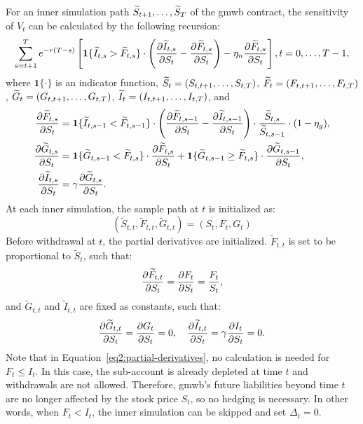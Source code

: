 For an inner simulation path $\widetilde{S}_{t+1},\ldots,\widetilde{S}_{T}$ of the \gls{gmwb} contract, the sensitivity of $V_t$ can be calculated by the following recursion:
\begin{equation}
    \sum_{s=t+1}^{T} e^{-r(T-s)} \left[\bm{1}\{\widetilde{I}_{t,s} > \widetilde{F}_{t,s}\} \cdot \left( \frac{\partial \widetilde{I}_{t,s}}{ \partial S_t} - \frac{\partial \widetilde{F}_{t,s}}{ \partial S_t}\right)- \eta_n \frac{\partial \widetilde{F}_{t,s}}{ \partial S_t}\right], \nonumber \\
    t=0,\ldots,T-1, 
\end{equation}
where $\bm{1}\{\cdot\}$ is an indicator function, $\widetilde{S}_t = (S_{t, t+1},\ldots,S_{t, T})$, $\widetilde{F}_t = (F_{t, t+1},\ldots,F_{t, T})$, $\widetilde{G}_t = (G_{t, t+1},\ldots,G_{t, T})$, $\widetilde{I}_t = (I_{t, t+1},\ldots,I_{t, T})$, and
\begin{align} \label{eq2:partial-derivatives}
    \frac{\partial \widetilde{F}_{t, s}}{ \partial S_t} &= \bm{1}\{\widetilde{I}_{t, s-1} < \widetilde{F}_{t, s-1}\}\cdot\left( \frac{\partial \widetilde{F}_{t, s-1}}{ \partial S_t} - \frac{\partial \widetilde{I}_{t, s-1}}{ \partial S_t}\right) \cdot \frac{\widetilde{S}_{t, s}}{\widetilde{S}_{t, s-1}}\cdot (1-\eta_g),\nonumber \\
    \frac{\partial \widetilde{G}_{t, s}}{ \partial S_t} &= \bm{1}\{\widetilde{G}_{t, s-1} < \widetilde{F}_{t, s}\}\cdot\frac{\partial \widetilde{F}_{t, s}}{ \partial S_t} + \bm{1}\{\widetilde{G}_{t, s-1} \geq \widetilde{F}_{t, s}\}\cdot\frac{\partial \widetilde{G}_{t, s-1}}{ \partial S_t},\nonumber \\
    \frac{\partial \widetilde{I}_{t, s}}{ \partial S_t} &= \gamma \frac{\partial \widetilde{G}_{t, s}}{ \partial S_t}.
\end{align}
At each inner simulation, the sample path at $t$ is initialized as:
\begin{equation}
    (\tilde{S}_{t, t}, \tilde{F}_{t, t}, \tilde{G}_{t, t}) = (S_t, F_t, G_t) 
\end{equation}
Before withdrawal at $t$, the partial derivatives are initialized. $\tilde{F}_{t, t}$ is set to be proportional to $\tilde{S}_{t}$, such that:
\begin{equation}
    \frac{\partial \widetilde{F}_{t, t}}{ \partial S_t} = \frac{\partial F_t}{ \partial S_t} = \frac{F_t}{S_t},
\end{equation}
and $\tilde{G}_{t, t}$ and $\tilde{I}_{t, t}$ are fixed as constants, such that:
\begin{equation}
    \frac{\partial \widetilde{G}_{t, t}}{ \partial S_t} = \frac{\partial G_{t}}{ \partial S_t} = 0, \quad \frac{\partial \widetilde{I}_{t, t}}{ \partial S_t} = \gamma \frac{\partial I_{t}}{ \partial S_t} = 0.
\end{equation}
Note that in Equation~\ref{eq2:partial-derivatives}, no calculation is needed for $F_t \leq I_t$. 
In this case, the sub-account is already depleted at time $t$ and withdrawals are not allowed.
Therefore, \gls{gmwb}'s future liabilities beyond time $t$ are no longer affected by the stock price $S_t$, so no hedging is necessary.
In other words, when $F_t < I_t$, the inner simulation can be skipped and set $\Delta_t = 0$.

